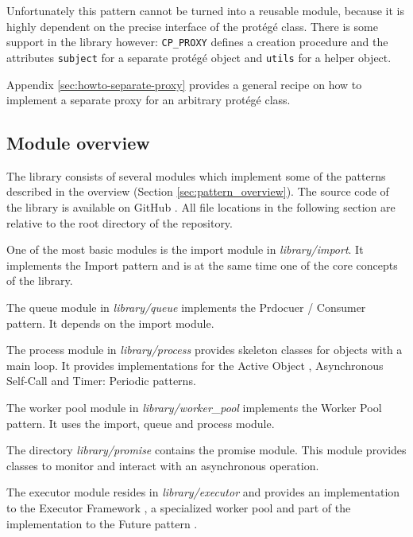 \documentclass[a4paper,10pt,titlepage]{article}
\newcommand{\dir}{\emph}
\begin{document}
Unfortunately this pattern cannot be turned into a reusable module, because it is highly dependent on the precise interface of the protégé class.
There is some support in the library however: 
\lstinline!CP_PROXY! defines a creation procedure and the attributes \lstinline!subject! for a separate protégé object and \lstinline!utils! for a helper object.

Appendix \ref{sec:howto-separate-proxy} provides a general recipe on how to implement a separate proxy for an arbitrary protégé class.

\subsection {Module overview}
\label{sec:module-overview}
The library consists of several modules which implement some of the patterns described in the overview (Section \ref{sec:pattern_overview}).
The source code of the library is available on GitHub \cite{web:repository}.
All file locations in the following section are relative to the root directory of the repository.

One of the most basic modules is the import module in \dir{library/import}.
It implements the Import  pattern  and is at the same time one of the core concepts of the library.

The queue module in \dir{library/queue} implements the Prdocuer / Consumer  pattern.
It depends on the import module.

The process module in \dir{library/process} provides skeleton classes for objects with a main loop.
It provides implementations for the Active Object , Asynchronous Self-Call  and Timer: Periodic  patterns.

The worker pool module in \dir{library/worker\_pool} implements the Worker Pool  pattern.
It uses the import, queue and process module.

The directory \dir{library/promise} contains the promise module.
This module provides classes to monitor and interact with an asynchronous operation.

The executor module resides in \dir{library/executor} and provides an implementation to the Executor Framework , 
a specialized worker pool and part of the implementation to the Future pattern .
\end{document}
